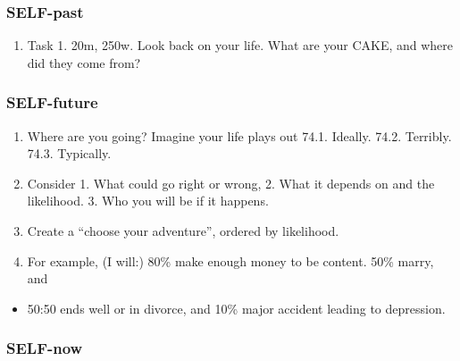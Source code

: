 \documentclass[
]{book}
\providecommand{\tightlist}{%
  \setlength{\itemsep}{0pt}\setlength{\parskip}{0pt}}
\begin{document}
\hypertarget{self-past}{%
\subsubsection{SELF-past}\label{self-past}}

\begin{enumerate}
\def\labelenumi{\arabic{enumi}.}
\setcounter{enumi}{72}
\tightlist
\item
  Task 1. 20m, 250w. Look back on your life. What are your CAKE, and where did
  they come from?
\end{enumerate}

\hypertarget{self-future}{%
\subsubsection{SELF-future}\label{self-future}}

\begin{enumerate}
\def\labelenumi{\arabic{enumi}.}
\setcounter{enumi}{73}
\tightlist
\item
  Where are you going? Imagine your life plays out
  74.1. Ideally.
  74.2. Terribly.
  74.3. Typically.
\item
  Consider 1. What could go right or wrong, 2. What it depends on and the
  likelihood. 3. Who you will be if it happens.
\item
  Create a ``choose your adventure'', ordered by likelihood.
\item
  For example, (I will:) 80\% make enough money to be content. 50\% marry, and
\end{enumerate}

\begin{itemize}
\tightlist
\item
  50:50 ends well or in divorce, and 10\% major accident leading to depression.
\end{itemize}

\hypertarget{self-now}{%
\subsubsection{SELF-now}\label{self-now}}
\end{document}
